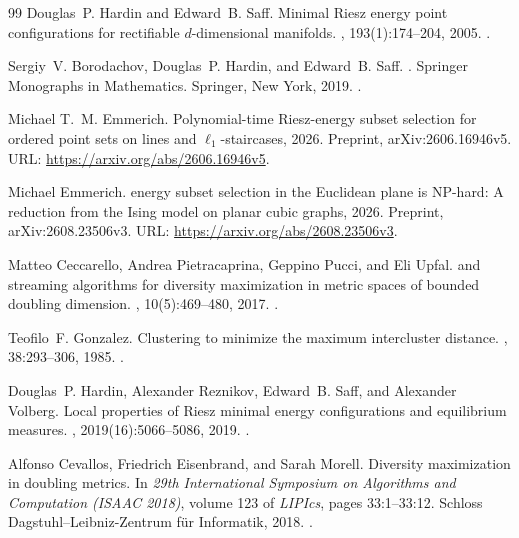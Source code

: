 \documentclass[a4paper,12pt]{article}
\numberwithin{equation}{section}
\begin{document}
\begin{thebibliography}{99}
Douglas~P. Hardin and Edward~B. Saff.
\newblock Minimal {Riesz} energy point configurations for rectifiable {$d$}-dimensional manifolds.
, 193(1):174--204, 2005.
\newblock \href{https://doi.org/10.1016/j.aim.2004.05.006}{}.

Sergiy~V. Borodachov, Douglas~P. Hardin, and Edward~B. Saff.
.
\newblock Springer Monographs in Mathematics. Springer, New York, 2019.
\newblock \href{https://doi.org/10.1007/978-0-387-84808-2}{}.

Michael T.~M. Emmerich.
\newblock Polynomial-time {Riesz}-energy subset selection for ordered point
  sets on lines and {$\ell_1$}-staircases, 2026.
\newblock Preprint, arXiv:2606.16946v5.
\newblock URL: \url{https://arxiv.org/abs/2606.16946v5}.

Michael Emmerich.
 energy subset selection in the {Euclidean} plane is
  {NP}-hard: A reduction from the {Ising} model on planar cubic graphs, 2026.
\newblock Preprint, arXiv:2608.23506v3.
\newblock URL: \url{https://arxiv.org/abs/2608.23506v3}.

Matteo Ceccarello, Andrea Pietracaprina, Geppino Pucci, and Eli Upfal.
 and streaming algorithms for diversity maximization in metric spaces of bounded doubling dimension.
, 10(5):469--480, 2017.
\newblock \href{https://doi.org/10.14778/3055540.3055541}{}.

Teofilo~F. Gonzalez.
\newblock Clustering to minimize the maximum intercluster distance.
, 38:293--306, 1985.
\newblock \href{https://doi.org/10.1016/0304-3975(85)90224-5}{}.

Douglas~P. Hardin, Alexander Reznikov, Edward~B. Saff, and Alexander Volberg.
\newblock Local properties of {Riesz} minimal energy configurations and equilibrium measures.
, 2019(16):5066--5086, 2019.
\newblock \href{https://doi.org/10.1093/imrn/rnx262}{}.

Alfonso Cevallos, Friedrich Eisenbrand, and Sarah Morell.
\newblock Diversity maximization in doubling metrics.
\newblock In {\em 29th International Symposium on Algorithms and Computation (ISAAC 2018)}, volume 123 of {\em LIPIcs}, pages 33:1--33:12. Schloss Dagstuhl--Leibniz-Zentrum f{\"u}r Informatik, 2018.
\newblock \href{https://doi.org/10.4230/LIPIcs.ISAAC.2018.33}{}.


\end{thebibliography}
\end{document}
